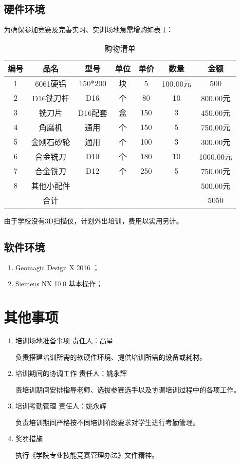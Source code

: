 \documentclass[a4paper,zihao=-4,linespread=1.35]{ctexart}
\begin{document}
\subsection{硬件环境}
为确保参加竞赛及完善实习、实训场地急需增购如表 \ref{购物清单}\/：
\begin{table}[ht]
\begin{center}

		\begin{tabular}{|c|c|c|c|c|c|c|}  
		\hline 
编号	&品名	&型号	&单位	&单价	&数量	&金额\\\hline
1	&6061硬铝	&150*200	&块	&5	&100.00元	&500\\\hline
2	&D16铣刀杆	&D16	&个	&80	&10	&800.00元\\\hline
3	&铣刀片	&D16配套	&盒	&150	&3	&450.00元\\\hline
4	&角磨机	&通用	&个	&150	&5	&750.00元\\\hline
5	&金刚石砂轮	&通用	&个	&100	&3	&300.00元\\\hline
6	&合金铣刀	&D10	&个	&180	&10	&1000.00元\\\hline
7	&合金铣刀	&D12	&个	&250	&5	&750.00元\\\hline
8	&其他小配件	&	&	&	&	&500.00元\\\hline
&合计	&	&	&	&	&5050\\\hline
	\end{tabular}  		\caption{购物清单}  \label{购物清单}
\end{center}
\end{table} 

由于学校没有3D扫描仪，计划外出培训，费用以实用另计。

\subsection{软件环境}
\begin{enumerate}[\indent A、]
\item Geomagic Design X 2016 ；
\item Siemens NX 10.0 基本操作；
\end{enumerate}

\section{其他事项} 
\begin{enumerate}[\indent1、]
	\item 培训场地准备事项  责任人：高星
\par
	负责搭建培训所需的软硬件环境、提供培训所需的设备或耗材。 
	\item 培训期间的协调工作 责任人：姚永辉
\par
	责培训期间安排指导老师、选拔参赛选手以及协调培训过程中的各项工作。 
	\item 培训考勤管理 责任人：姚永辉
\par
	负责培训期间严格按不同培训阶段要求对学生进行考勤管理。 
	\item 奖罚措施
\par
	执行《学院专业技能竞赛管理办法》文件精神。
\end{enumerate}
\end{document}

